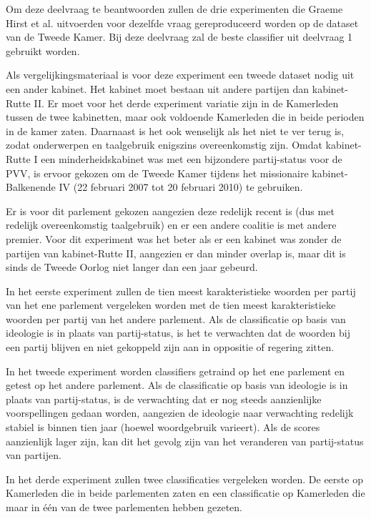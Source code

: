 Om deze deelvraag te beantwoorden zullen de drie experimenten die Graeme Hirst et al. uitvoerden voor dezelfde vraag gereproduceerd worden op de dataset van de Tweede Kamer. Bij deze deelvraag zal de beste classifier uit deelvraag 1 gebruikt worden. \par
Als vergelijkingsmateriaal is voor deze experiment een tweede dataset nodig uit een ander kabinet. Het kabinet moet bestaan uit andere partijen dan kabinet-Rutte II. Er moet voor het derde experiment variatie zijn in de Kamerleden tussen de twee kabinetten, maar ook voldoende Kamerleden die in beide perioden in de kamer zaten. Daarnaast is het ook wenselijk als het niet te ver terug is, zodat onderwerpen en taalgebruik enigszins overeenkomstig zijn. Omdat kabinet-Rutte I een minderheidskabinet was met een bijzondere partij-status voor de PVV, is ervoor gekozen om de Tweede Kamer tijdens het missionaire kabinet-Balkenende IV (22 februari 2007 tot 20 februari 2010) te gebruiken.\par
Er is voor dit parlement gekozen aangezien deze redelijk recent is (dus met redelijk overeenkomstig taalgebruik) en er een andere coalitie is met andere premier. Voor dit experiment was het beter als er een kabinet was zonder de partijen van kabinet-Rutte II, aangezien er dan minder overlap is, maar dit is sinds de Tweede Oorlog niet langer dan een jaar gebeurd. \par
In het eerste experiment zullen de tien meest karakteristieke woorden per partij van het ene parlement vergeleken worden met de tien meest karakteristieke woorden per partij van het andere parlement. Als de classificatie op basis van ideologie is in plaats van partij-status, is het te verwachten dat de woorden bij een partij blijven en niet gekoppeld zijn aan in oppositie of regering zitten. \par
In het tweede experiment worden classifiers getraind op het ene parlement en getest op het andere parlement. Als de classificatie op basis van ideologie is in plaats van partij-status, is de verwachting dat er nog steeds aanzienlijke voorspellingen gedaan worden, aangezien de ideologie naar verwachting redelijk stabiel is binnen tien jaar (hoewel woordgebruik varieert). Als de scores aanzienlijk lager zijn, kan dit het gevolg zijn van het veranderen van partij-status van partijen.\par
In het derde experiment zullen twee classificaties vergeleken worden. De eerste op Kamerleden die in beide parlementen zaten en een classificatie op Kamerleden die maar in één van de twee parlementen hebben gezeten.\par
